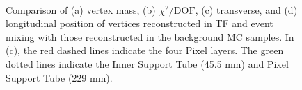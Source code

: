 \begin{figure}[!htb]
    \centering
     \\
    \caption{Comparison of (a) vertex mass, (b) $\chi^{2} / \mathrm{DOF}$, (c) transverse, and (d) longitudinal position of \xx vertices reconstructed in TF and event mixing with those reconstructed in the background MC samples. In (c), the red dashed lines indicate the four Pixel layers. The green dotted lines indicate the Inner Support Tube (45.5 mm) and Pixel Support Tube (229 mm).}
    \label{fig:random-crossing_vertex_dist}
\end{figure}


